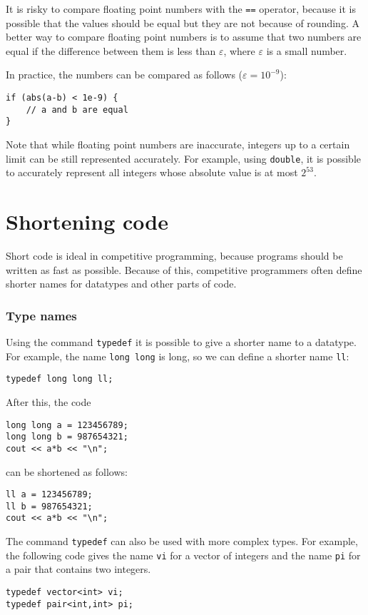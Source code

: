 It is risky to compare floating point numbers
with the \texttt{==} operator,
because it is possible that the values should
be equal but they are not because of rounding.
A better way to compare floating point numbers
is to assume that two numbers are equal
if the difference between them is less than $\varepsilon$,
where $\varepsilon$ is a small number.

In practice, the numbers can be compared
as follows ($\varepsilon=10^{-9}$):

\begin{lstlisting}
if (abs(a-b) < 1e-9) {
    // a and b are equal
}
\end{lstlisting}

Note that while floating point numbers are inaccurate,
integers up to a certain limit can be still
represented accurately.
For example, using \texttt{double},
it is possible to accurately represent all
integers whose absolute value is at most $2^{53}$.

\section{Shortening code}

Short code is ideal in competitive programming,
because programs should be written
as fast as possible.
Because of this, competitive programmers often define
shorter names for datatypes and other parts of code.

\subsubsection{Type names}
Using the command \texttt{typedef}
it is possible to give a shorter name
to a datatype.
For example, the name \texttt{long long} is long,
so we can define a shorter name \texttt{ll}:
\begin{lstlisting}
typedef long long ll;
\end{lstlisting}
After this, the code
\begin{lstlisting}
long long a = 123456789;
long long b = 987654321;
cout << a*b << "\n";
\end{lstlisting}
can be shortened as follows:
\begin{lstlisting}
ll a = 123456789;
ll b = 987654321;
cout << a*b << "\n";
\end{lstlisting}

The command \texttt{typedef}
can also be used with more complex types.
For example, the following code gives
the name \texttt{vi} for a vector of integers
and the name \texttt{pi} for a pair
that contains two integers.
\begin{lstlisting}
typedef vector<int> vi;
typedef pair<int,int> pi;
\end{lstlisting}


